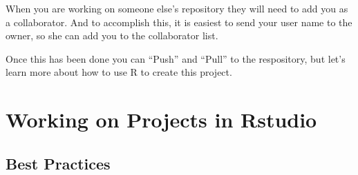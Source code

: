 \documentclass[12pt]{../SOP4_alpha}\usepackage[]{graphicx}\usepackage[]{xcolor}
\begin{document}
\NP When you are working on someone else's repository they will need to add you as a collaborator. And to accomplish this, it is easiest to send your user name to the owner, so she can add you to the collaborator list.  

\NP Once this has been done you can ``Push'' and ``Pull'' to the respository, but let's learn more about how to use R to create this project. 




\section{Working on Projects in Rstudio}

\subsection{Best Practices}
\end{document}
